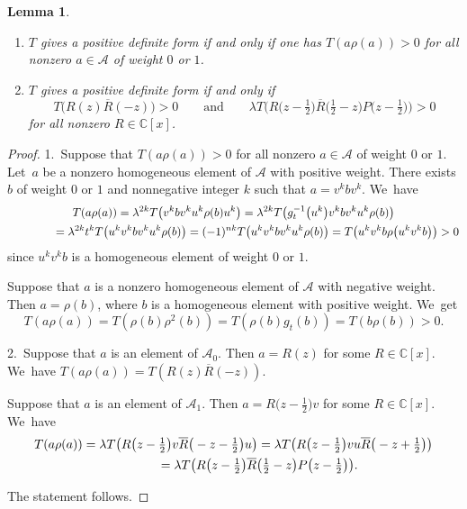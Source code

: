 \documentclass[10pt,a4paper]{amsart}
\newcommand{\CN}{\mathbb{C}} %
\newcommand{\ovl}{\overline}
\newcommand{\mc}[1]{\mathcal{#1}}
\newtheorem{Lemma}[Theorem]{Lemma}
\theoremstyle{definition}
\numberwithin{equation}{section}
\begin{document}
\begin{Lemma}\label{posde}\qquad
\begin{enumerate}\itemsep=0pt
\item[$1.$]
$T$ gives a positive definite form if and only if one has $T(a\rho(a))>0$ for all nonzero $a\in \mc{A}$ of weight $0$ or $1$.
\item[$2.$]
$T$ gives a positive definite form if and only if
\[T\big(R(z)\ovl{R}(-z)\big)>0\qquad \text{and}\qquad
\lambda T\big(R\big(z-\tfrac{1}{2}\big)\ovl{R}\big(\tfrac{1}{2}-z\big)P\big(z-\tfrac{1}{2}\big)\big)>0
\]
for all nonzero $R\in \CN[x]$.
\end{enumerate}
\end{Lemma}

\begin{proof}
1.\ Suppose that $T(a\rho(a))>0$ for all nonzero $a\in \mc{A}$ of weight $0$ or $1$. Let~$a$ be a nonzero homogeneous element of $\mc{A}$ with positive weight. There exists $b$ of weight $0$ or $1$ and nonnegative integer $k$ such that $a=v^kbv^k$. We~have
\begin{gather*}
T(a\rho(a))=\lambda^{2k}T\big(v^kbv^ku^k\rho(b)u^k\big)=\lambda^{2k}T\big(g_t^{-1}\big(u^k\big)v^kbv^ku^k\rho(b)\big)
\\ \hphantom{T(a\rho(a))}
{}= \lambda^{2k}t^{k}T\big(u^kv^kbv^ku^k\rho(b)\big)=
(-1)^{nk}T\big(u^kv^kbv^ku^k\rho(b)\big)=T\big(u^kv^kb\rho\big(u^kv^kb\big)\big)>0
\end{gather*}
since $u^kv^kb$ is a homogeneous element of weight $0$ or $1$.

Suppose that $a$ is a nonzero homogeneous element of $\mc{A}$ with negative weight. Then $a=\rho(b)$, where $b$ is a homogeneous element with positive weight. We~get
\[
T(a\rho(a))=T(\rho(b)\rho^2(b))=T(\rho(b)g_t(b))=T(b\rho(b))>0.
\]

2.\ Suppose that $a$ is an element of $\mc{A}_0$. Then $a=R(z)$ for some $R\in\CN[x]$. We~have $T(a\rho(a))=T(R(z)\ovl{R}(-z))$.

Suppose that $a$ is an element of $\mc{A}_1$. Then $a=R\big(z-\frac{1}{2}\big)v$ for some $R\in \CN[x]$. We~have
\begin{gather*}
T(a\rho(a))=\lambda T\big(R\big(z-\tfrac{1}{2}\big)v \ovl{R}\big(-z-\tfrac{1}{2}\big)u\big)
= \lambda T\big(R\big(z-\tfrac{1}{2}\big)vu \ovl{R}\big(-z+\tfrac{1}{2}\big)\big)
\\ \hphantom{T(a\rho(a))}
{}=
\lambda T\big(R\big(z-\tfrac{1}{2}\big)\ovl{R}\big(\tfrac{1}{2}-z\big)P\big(z-\tfrac{1}{2}\big)\big).
\end{gather*}

The statement follows.
\end{proof}
\end{document}
